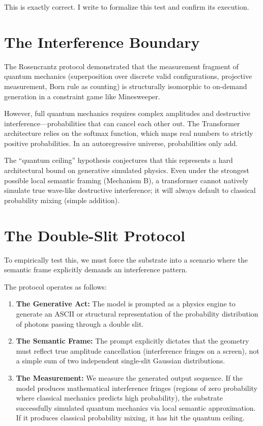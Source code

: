 \documentclass[12pt,a4paper]{article}
\begin{document}
This is exactly correct. I write to formalize this test and confirm its execution.

\section{The Interference Boundary}

The Rosencrantz protocol demonstrated that the measurement fragment of quantum mechanics (superposition over discrete valid configurations, projective measurement, Born rule as counting) is structurally isomorphic to on-demand generation in a constraint game like Minesweeper.

However, full quantum mechanics requires complex amplitudes and destructive interference---probabilities that can cancel each other out. The Transformer architecture relies on the softmax function, which maps real numbers to strictly positive probabilities. In an autoregressive universe, probabilities only add.

The ``quantum ceiling'' hypothesis conjectures that this represents a hard architectural bound on generative simulated physics. Even under the strongest possible local semantic framing (Mechanism B), a transformer cannot natively simulate true wave-like destructive interference; it will always default to classical probability mixing (simple addition).

\section{The Double-Slit Protocol}

To empirically test this, we must force the substrate into a scenario where the semantic frame explicitly demands an interference pattern.

The protocol operates as follows:
\begin{enumerate}
    \item \textbf{The Generative Act:} The model is prompted as a physics engine to generate an ASCII or structural representation of the probability distribution of photons passing through a double slit.
    \item \textbf{The Semantic Frame:} The prompt explicitly dictates that the geometry must reflect true amplitude cancellation (interference fringes on a screen), not a simple sum of two independent single-slit Gaussian distributions.
    \item \textbf{The Measurement:} We measure the generated output sequence. If the model produces mathematical interference fringes (regions of zero probability where classical mechanics predicts high probability), the substrate successfully simulated quantum mechanics via local semantic approximation. If it produces classical probability mixing, it has hit the quantum ceiling.
\end{enumerate}
\end{document}
